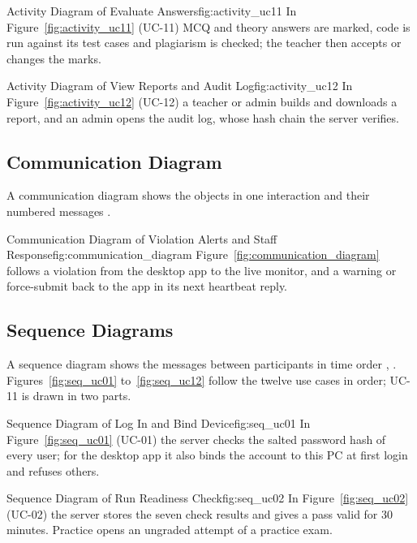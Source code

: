 %
{Activity Diagram of Evaluate Answers}{fig:activity_uc11}%
{In Figure~\ref{fig:activity_uc11} (UC-11) MCQ and theory answers are marked, code is run against its test cases and plagiarism is checked; the teacher then accepts or changes the marks.}

%
{Activity Diagram of View Reports and Audit Log}{fig:activity_uc12}%
{In Figure~\ref{fig:activity_uc12} (UC-12) a teacher or admin builds and downloads a report, and an admin opens the audit log, whose hash chain the server verifies.}

\subsection{Communication Diagram}
A communication diagram shows the objects in one interaction and their numbered messages \cite[Cl.~17.9]{omg_uml251}.

%
{Communication Diagram of Violation Alerts and Staff Response}{fig:communication_diagram}%
{Figure~\ref{fig:communication_diagram} follows a violation from the desktop app to the live monitor, and a warning or force-submit back to the app in its next heartbeat reply.}

\subsection{Sequence Diagrams}
A sequence diagram shows the messages between participants in time order \cite[Cl.~17.8]{omg_uml251}, \cite{sequence_diagram_vp}. Figures~\ref{fig:seq_uc01} to~\ref{fig:seq_uc12} follow the twelve use cases in order; UC-11 is drawn in two parts.

%
{Sequence Diagram of Log In and Bind Device}{fig:seq_uc01}%
{In Figure~\ref{fig:seq_uc01} (UC-01) the server checks the salted password hash \cite{rfc8018} of every user; for the desktop app it also binds the account to this PC at first login and refuses others.}

%
{Sequence Diagram of Run Readiness Check}{fig:seq_uc02}%
{In Figure~\ref{fig:seq_uc02} (UC-02) the server stores the seven check results and gives a pass valid for 30 minutes. Practice opens an ungraded attempt of a practice exam.}

